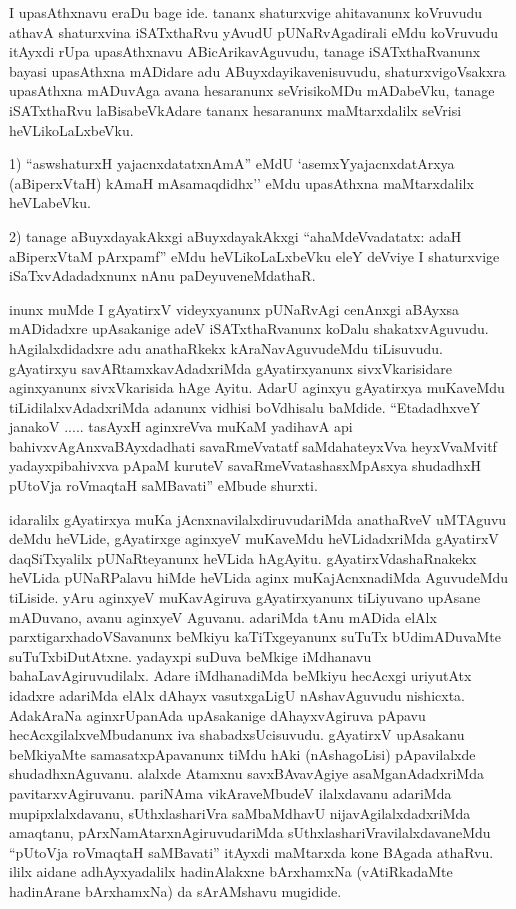 \begin{artha}
I upasAthxnavu eraDu bage ide. tananx shaturxvige ahitavanunx koVruvudu athavA shaturxvina iSATxthaRvu yAvudU pUNaRvAgadirali eMdu koVruvudu itAyxdi rUpa upasAthxnavu ABicArikavAguvudu, tanage iSATxthaRvanunx bayasi upasAthxna mADidare adu ABuyxdayikavenisuvudu, shaturxvigoVsakxra upasAthxna mADuvAga avana hesaranunx seVrisikoMDu mADabeVku, tanage iSATxthaRvu laBisabeVkAdare tananx hesaranunx maMtarxdalilx seVrisi heVLikoLaLxbeVku.

1) ``aswshaturxH yajacnxdatatxnAmA'' eMdU `asemxYyajacnxdatArxya (aBiperxVtaH) kAmaH mAsamaqdidhx'' eMdu upasAthxna maMtarxdalilx heVLabeVku.

2) tanage aBuyxdayakAkxgi aBuyxdayakAkxgi ``ahaMdeVvadatatx: adaH aBiperxVtaM pArxpamf'' eMdu heVLikoLaLxbeVku eleY deVviye I shaturxvige iSaTxvAdadadxnunx nAnu paDeyuveneMdathaR.
\end{artha}

\begin{artha}
inunx muMde I gAyatirxV videyxyanunx pUNaRvAgi cenAnxgi aBAyxsa mADidadxre upAsakanige adeV iSATxthaRvanunx koDalu shakatxvAguvudu. hAgilalxdidadxre adu anathaRkekx kAraNavAguvudeMdu tiLisuvudu. gAyatirxyu savARtamxkavAdadxriMda gAyatirxyanunx sivxVkarisidare aginxyanunx sivxVkarisida hAge Ayitu. AdarU aginxyu gAyatirxya muKaveMdu tiLidilalxvAdadxriMda adanunx vidhisi boVdhisalu baMdide. ``EtadadhxveY janakoV ..... tasAyxH aginxreVva muKaM yadihavA api bahivxvAgAnxvaBAyxdadhati savaRmeVvatatf saMdahateyxVva heyxVvaMvitf yadayxpibahivxva pApaM kuruteV savaRmeVvatashasxMpAsxya shudadhxH pUtoV\s ja roV\s maqtaH saMBavati'' eMbude shurxti. 

idaralilx gAyatirxya muKa jAcnxnavilalxdiruvudariMda anathaRveV uMTAguvu deMdu heVLide, gAyatirxge aginxyeV muKaveMdu heVLidadxriMda gAyatirxV daqSiTxyalilx pUNaRteyanunx heVLida hAgAyitu. gAyatirxVdashaRnakekx heVLida pUNaRPalavu hiMde heVLida aginx muKajAcnxnadiMda AguvudeMdu tiLiside. yAru aginxyeV muKavAgiruva gAyatirxyanunx tiLiyuvano upAsane mADuvano, avanu aginxyeV Aguvanu. adariMda tAnu mADida elAlx parxtigarxhadoVSavanunx beMkiyu kaTiTxgeyanunx suTuTx bUdimADuvaMte suTuTxbiDutAtxne. yadayxpi suDuva beMkige iMdhanavu  bahaLavAgiruvudilalx. Adare iMdhanadiMda beMkiyu hecAcxgi uriyutAtx idadxre adariMda elAlx dAhayx vasutxgaLigU nAshavAguvudu nishicxta. AdakAraNa aginxrUpanAda upAsakanige dAhayxvAgiruva pApavu hecAcxgilalxveMbudanunx iva shabadxsUcisuvudu. gAyatirxV upAsakanu beMkiyaMte samasatxpApavanunx tiMdu hAki (nAshagoLisi) pApavilalxde shudadhxnAguvanu. alalxde Atamxnu savxBAvavAgiye asaMganAdadxriMda pavitarxvAgiruvanu. pariNAma vikAraveMbudeV ilalxdavanu adariMda mupipxlalxdavanu, sUthxlashariVra saMbaMdhavU nijavAgilalxdadxriMda amaqtanu, pArxNamAtarxnAgiruvudariMda sUthxlashariVravilalxdavaneMdu ``pUtoV\s ja roV\s maqtaH saMBavati'' itAyxdi maMtarxda kone BAgada athaRvu. ililx aidane adhAyxyadalilx hadinAlakxne bArxhamxNa (vAtiRkadaMte hadinArane bArxhamxNa) da sArAMshavu mugidide.
\end{artha}

